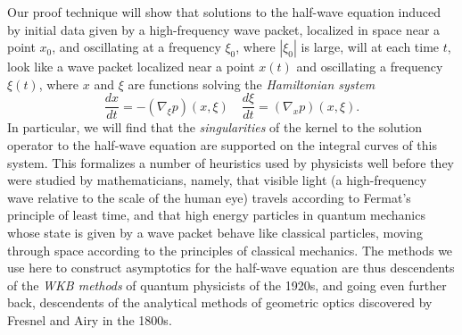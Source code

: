\documentclass{article}
\theoremstyle{plain}
\theoremstyle{remark}
\theoremstyle{definition}
\begin{document}
Our proof technique will show that solutions to the half-wave equation induced by initial data given by a high-frequency wave packet, localized in space near a point $x_0$, and oscillating at a frequency $\xi_0$, where $|\xi_0|$ is large, will at each time $t$, look like a wave packet localized near a point $x(t)$ and oscillating a frequency $\xi(t)$, where $x$ and $\xi$ are functions solving the \emph{Hamiltonian system}
%
\[ \frac{dx}{dt} = - (\nabla_\xi p)(x, \xi) \quad \frac{d \xi}{dt} = (\nabla_x p)(x,\xi). \]
%
In particular, we will find that the \emph{singularities} of the kernel to the solution operator to the half-wave equation are supported on the integral curves of this system. This formalizes a number of heuristics used by physicists well before they were studied by mathematicians, namely, that visible light (a high-frequency wave relative to the scale of the human eye) travels according to Fermat's principle of least time, and that high energy particles in quantum mechanics whose state is given by a wave packet behave like classical particles, moving through space according to the principles of classical mechanics. The methods we use here to construct asymptotics for the half-wave equation are thus descendents of the \emph{WKB methods} of quantum physicists of the 1920s, and going even further back, descendents of the analytical methods of geometric optics discovered by Fresnel and Airy in the 1800s.

\end{document}
